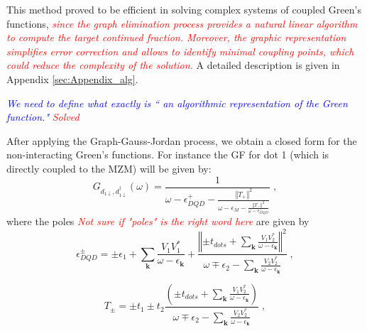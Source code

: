 \documentclass[showpacs,aps,prb,reprint,superscriptaddress]{revtex4-2}
\newcommand{\LUIS}[1]{\textcolor{blue}{\fbox{Luis} {\sl#1}}}
\newcommand{\Jesus}[1]{\textcolor{red}{\fbox{Jesus} {\sl#1}}}
\newcommand{\change}[1]{\textcolor{red}{\sl#1}}
\begin{document}
This method proved to be efficient in solving complex systems of coupled Green's functions, \change{since the graph elimination process provides a natural linear algorithm to compute the target continued fraction. Moreover, the graphic representation simplifies error correction and allows to identify minimal coupling points, which could reduce the complexity of the solution.} A detailed description is given in Appendix \ref{sec:Appendix_alg}. 

\LUIS{We need to define what exactly is `` an algorithmic representation of the Green function." } \Jesus{Solved}



After applying the Graph-Gauss-Jordan process, we obtain a closed form for the non-interacting Green's functions. For instance the GF for dot 1 (which is directly coupled to the MZM) will be given by:
%
\begin{equation}
G_{{d_{1\downarrow},d_{1\downarrow}^{\dagger}}}\left(\omega\right)=\frac{1}{\omega-\epsilon_{DQD}^{+}-\frac{\left\Vert T_{+}\right\Vert ^{2}}{\omega-\epsilon_{M}-\frac{\left\Vert T_{-}\right\Vert ^{2}}{\omega -\epsilon_{DQD}^{-}}}} \; ,
    \label{eq:Green_NonInteracting}
\end{equation}
%
\noindent where the poles \Jesus{Not sure if "poles" is the right word here} are given by
%
\begin{equation}
%
\epsilon_{DQD}^{\pm}=\pm\epsilon_{1}+\sum_{\mathbf{k}}\frac{V_{1}V_{1}^{*}}{\omega-\epsilon_{\mathbf{k}}}+\frac{\left\Vert \pm t_{dots}+\sum_{\mathbf{k}}\frac{V_{1}V_{2}^{*}}{\omega-\epsilon_{\mathbf{k}}}\right\Vert ^{2}}{\omega\mp\epsilon_{2}-\sum_{\mathbf{k}}\frac{V_{2}V_{2}^{*}}{\omega-\epsilon_{\mathbf{k}}}} \; , \label{eq:epDQD}
\end{equation}
\noindent 

\begin{equation}
    T_{\pm}=\pm t_{1}\pm t_{2}\frac{\left(\pm t_{dots}+\sum_{\mathbf{k}}\frac{V_{1}V_{2}^{*}}{\omega-\epsilon_{\mathbf{k}}}\right)}{\omega\mp\epsilon_{2}-\sum_{\mathbf{k}}\frac{V_{2}V_{2}^{*}}{\omega-\epsilon_{\mathbf{k}}}} \; , \label{eq:T+-}
\end{equation}
\end{document}
